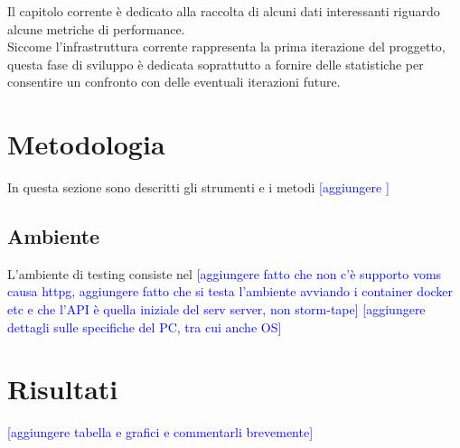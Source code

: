 
Il capitolo corrente è dedicato alla raccolta di alcuni dati interessanti riguardo alcune metriche di performance. 
\\ Siccome l'infrastruttura corrente rappresenta la prima iterazione del proggetto,
 questa fase di sviluppo è dedicata soprattutto a fornire delle statistiche per consentire un confronto con delle eventuali iterazioni future. 
 
 \section{Metodologia}
 In questa sezione sono descritti gli strumenti e i metodi 
 \textcolor{blue}{[aggiungere ]}

 \subsection{Ambiente}
 L'ambiente di testing consiste nel \textcolor{blue}{[aggiungere fatto che non c'è supporto voms causa httpg,
  aggiungere fatto che si testa l'ambiente avviando i container docker etc e che l'API è quella iniziale del serv server, non storm-tape]}
  \textcolor{blue}{[aggiungere dettagli sulle specifiche del PC, tra cui anche OS]}

 \section{Risultati}
 \textcolor{blue}{[aggiungere tabella e grafici e commentarli brevemente]}
